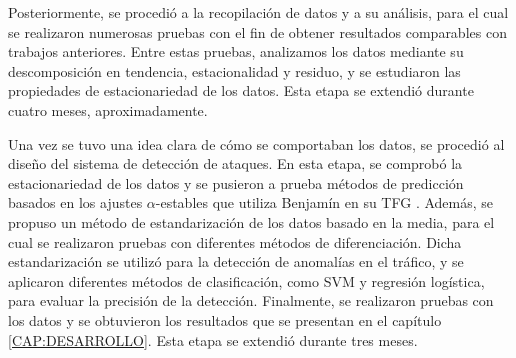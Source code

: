 Posteriormente, se procedió a la recopilación de datos y a su análisis, para el cual se realizaron numerosas pruebas con el fin de obtener resultados comparables con trabajos anteriores. Entre estas pruebas, analizamos los datos mediante su descomposición en tendencia, estacionalidad y residuo, y se estudiaron las propiedades de estacionariedad de los datos. Esta etapa se extendió durante cuatro meses, aproximadamente.

Una vez se tuvo una idea clara de cómo se comportaban los datos, se procedió al diseño del sistema de detección de ataques. En esta etapa, se comprobó la estacionariedad de los datos y se pusieron a prueba métodos de predicción basados en los ajustes $\alpha$-estables que utiliza Benjamín en su \ac{TFG} \cite{benjamin2021}. Además, se propuso un método de estandarización de los datos basado en la media, para el cual se realizaron pruebas con diferentes métodos de diferenciación. Dicha estandarización se utilizó para la detección de anomalías en el tráfico, y se aplicaron diferentes métodos de clasificación, como \ac{SVM} y regresión logística, para evaluar la precisión de la detección.
Finalmente, se realizaron pruebas con los datos y se obtuvieron los resultados que se presentan en el capítulo \ref{CAP:DESARROLLO}.
Esta etapa se extendió durante tres meses.